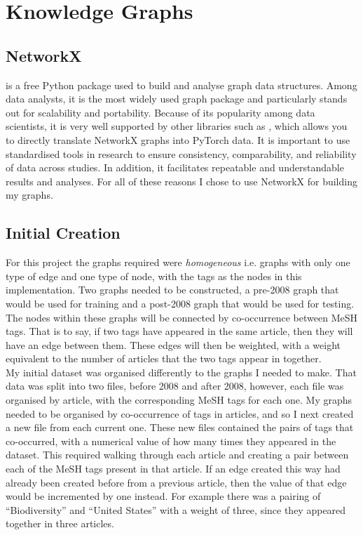 \documentclass{l4proj}
\begin{document}
\section{Knowledge Graphs}

\subsection{NetworkX}

\cite{networkx} is a free Python package used to build and analyse graph data structures. Among data analysts, it is the most widely used graph package and particularly stands out for scalability and portability. Because of its popularity among data scientists, it is very well supported by other libraries such as \cite{pytorch}, which allows you to directly translate NetworkX graphs into PyTorch \cite{pytorch_geometric} data. It is important to use standardised tools in research to ensure consistency, comparability, and reliability of data across studies. In addition, it  facilitates repeatable and understandable results and analyses. For all of these reasons I chose to use NetworkX for building my graphs. \\

\subsection{Initial Creation}

For this project the graphs required were \textit{homogeneous} i.e. graphs with only one type of edge and one type of node, with the tags as the nodes in this implementation. Two graphs needed to be constructed, a pre-2008 graph that would be used for training and a post-2008 graph that would be used for testing. The nodes within these graphs will be connected by co-occurrence between MeSH tags. That is to say, if two tags have appeared in the same article, then they will have an edge between them. These edges will then be weighted, with a weight equivalent to the number of articles that the two tags appear in together. \\

My initial dataset was organised differently to the graphs I needed to make. That  data was split into two files, before 2008 and after 2008, however, each file was organised by article, with the corresponding MeSH tags for each one. My graphs needed to be organised by co-occurrence of tags in articles, and so I next created a new file from each current one. These new files contained the pairs of tags that co-occurred, with a numerical value of how many times they appeared in the dataset. This required walking through each article and creating a pair between each of the MeSH tags present in that article. If an edge created this way had already been created before from a previous article, then the value of that edge would be incremented by one instead. For example there was a pairing of ``Biodiversity'' and ``United States'' with a weight of three, since they appeared together in three articles. \\
\end{document}
